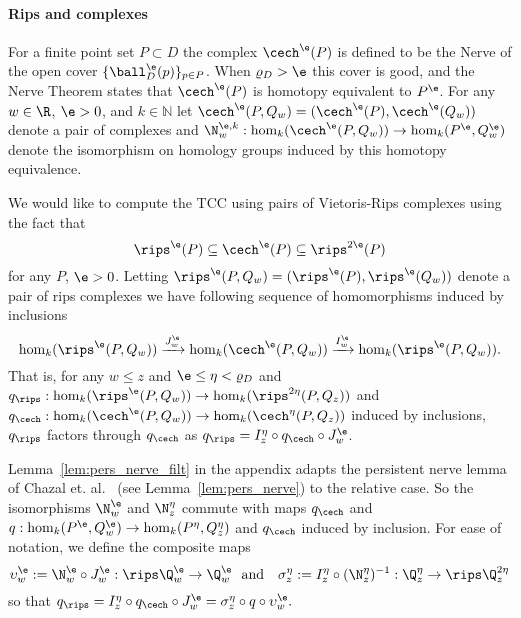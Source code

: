 
\paragraph{Rips and \Cech complexes}

For a finite point set $P\subset D$ the \Cech complex $\cech^\e(P)$ is defined to be the Nerve of the open cover $\{\ball_D^\e(p)\}_{p\in P}$.
When $\varrho_D > \e$ this cover is good, and the Nerve Theorem states that $\cech^\e(P)$ is homotopy equivalent to $P^\e$.
For any $w\in\R$, $\e > 0$, and $k\in\mathbb{N}$ let $\cech^\e(P,Q_w) = (\cech^\e(P), \cech^\e(Q_w))$ denote a pair of \Cech complexes and $\N_w^{\e, k} : \hom_k(\cech^\e(P,Q_w))\to \hom_k(P^\e, Q_w^\e)$ denote the isomorphism on homology groups induced by this homotopy equivalence.

We would like to compute the TCC using pairs of Vietoris-Rips complexes using the fact that
\[ \rips^\e(P)\subseteq \cech^\e(P)\subseteq \rips^{2\e}(P)\]
for any $P$, $\e >0$.
Letting $\rips^\e(P,Q_w) = (\rips^\e(P),\rips^\e(Q_w))$ denote a pair of rips complexes we have following sequence of homomorphisms induced by inclusions
\[ \hom_k(\rips^\e(P, Q_w))\xrightarrow{J_w^\e}\hom_k(\cech^\e(P, Q_w))\xrightarrow{I_w^\e}\hom_k(\rips^\e(P, Q_w)).\]
That is, for any $w\leq z$ and $\e\leq\eta < \varrho_D$ and $q_{\rips} : \hom_k(\rips^\e(P, Q_w))\to \hom_k(\rips^{2\eta}(P, Q_z))$ and $q_{\cech} : \hom_k(\cech^\e(P, Q_w))\to \hom_k(\cech^{\eta}(P, Q_z))$ induced by inclusions, $q_{\rips}$ factors through $q_{\cech}$ as $q_{\rips} = I_z^\eta\circ q_{\cech}\circ J_w^\e$.

Lemma~\ref{lem:pers_nerve_filt} in the appendix adapts the persistent nerve lemma of Chazal et. al.~\cite{chazal08towards} (see Lemma~\ref{lem:pers_nerve}) to the relative case.
So the isomorphisms $\N_w^\e$ and $\N_z^\eta$ commute with maps $q_{\cech}$ and $q : \hom_k(P^\e, Q_w^\e)\to\hom_k(P^\eta, Q_z^\eta)$ and $q_{\cech}$ induced by inclusion.
For ease of notation, we define the composite maps
\[ \upsilon_w^\e := \N_w^\e\circ J_w^\e : \rips\Q_w^\e\to \Q_w^\e\ \text{ and }\ \ \sigma_z^\eta := I_z^\eta\circ(\N_z^\eta)^{-1} : \Q_z^\eta \to \rips\Q_z^{2\eta}\]
so that $q_{\rips} = I_z^\eta\circ q_{\cech}\circ J_w^\e = \sigma_z^\eta\circ q\circ \upsilon_w^\e.$

